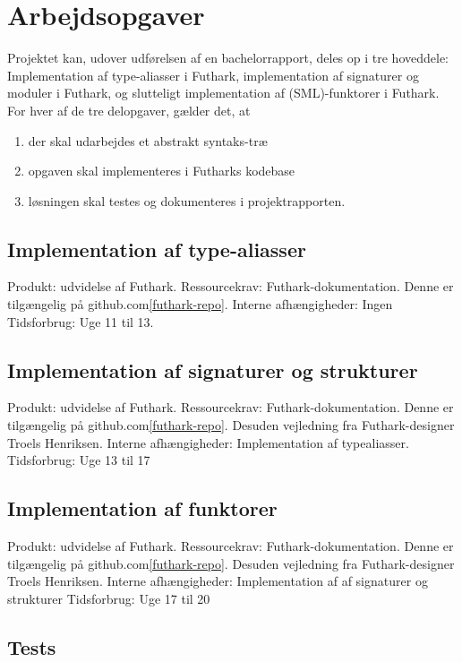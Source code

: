 \documentclass[12pt]{article}
\begin{document}
\section{Arbejdsopgaver}
Projektet kan, udover udførelsen af en bachelorrapport, deles op i tre
hoveddele:\\
Implementation af type-aliasser i Futhark, implementation af signaturer og
moduler i Futhark, og slutteligt implementation af (SML)-funktorer i Futhark.\\
For hver af de tre delopgaver, gælder det, at
\begin{enumerate}
  \item der skal udarbejdes et abstrakt syntaks-træ
  \item opgaven skal implementeres i Futharks kodebase
  \item løsningen skal testes og dokumenteres i projektrapporten.
\end{enumerate}


\subsection{Implementation af type-aliasser}
Produkt: udvidelse af Futhark.
Ressourcekrav: Futhark-dokumentation. Denne er tilgængelig på github.com\ref{futhark-repo}.
Interne afhængigheder: Ingen
Tidsforbrug: Uge 11 til 13.

\subsection{Implementation af signaturer og strukturer}
Produkt: udvidelse af Futhark.
Ressourcekrav: Futhark-dokumentation. Denne er tilgængelig på
github.com\ref{futhark-repo}. Desuden vejledning fra Futhark-designer Troels Henriksen. 
Interne afhængigheder: Implementation af typealiasser.
Tidsforbrug: Uge 13 til 17


\subsection{Implementation af funktorer}
Produkt: udvidelse af Futhark.
Ressourcekrav: Futhark-dokumentation. Denne er tilgængelig på
github.com\ref{futhark-repo}. 
Desuden vejledning fra Futhark-designer Troels Henriksen. 
Interne afhængigheder: Implementation af af signaturer og strukturer
Tidsforbrug: Uge 17 til 20

\subsection{Tests}
\end{document}
